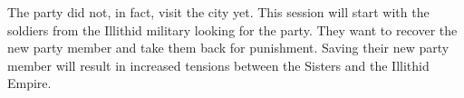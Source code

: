The party did not, in fact, visit the city yet.
This session will start with the soldiers from the Illithid military looking for the party.
They want to recover the new party member and take them back for punishment.
Saving their new party member will result in increased tensions between the Sisters and the Illithid Empire.